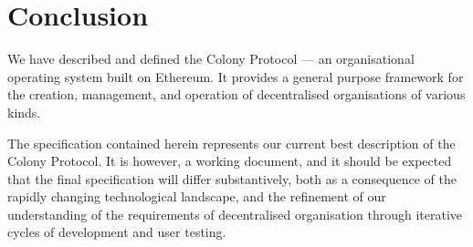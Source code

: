 \section{Conclusion}\label{sec:conclusion}\label{sec:conclusion}

We have described and defined the Colony Protocol --- an organisational operating system built on Ethereum. It provides a general purpose framework for the creation, management, and operation of decentralised organisations of various kinds.

The specification contained herein represents our current best description of the Colony Protocol. It is however, a working document, and it should be expected that the final specification will differ substantively, both as a consequence of the rapidly changing technological landscape, and the refinement of our understanding of the requirements of decentralised organisation through iterative cycles of development and user testing.